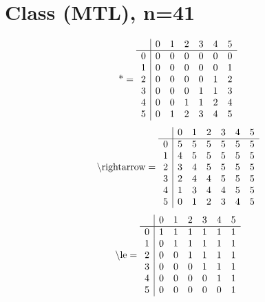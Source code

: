\documentclass[11pt]{article}
\begin{document}
\section{Class (MTL), n=41}
\[\text{*} = 
\begin{array}{r | r r r r r r}
 & 0 & 1 & 2 & 3 & 4 & 5 \\ \hline
0 & 0 & 0 & 0 & 0 & 0 & 0 \\
1 & 0 & 0 & 0 & 0 & 0 & 1 \\
2 & 0 & 0 & 0 & 0 & 1 & 2 \\
3 & 0 & 0 & 0 & 1 & 1 & 3 \\
4 & 0 & 0 & 1 & 1 & 2 & 4 \\
5 & 0 & 1 & 2 & 3 & 4 & 5 \\
\end{array}
\]
\[\text{\textbackslash rightarrow} = 
\begin{array}{r | r r r r r r}
 & 0 & 1 & 2 & 3 & 4 & 5 \\ \hline
0 & 5 & 5 & 5 & 5 & 5 & 5 \\
1 & 4 & 5 & 5 & 5 & 5 & 5 \\
2 & 3 & 4 & 5 & 5 & 5 & 5 \\
3 & 2 & 4 & 4 & 5 & 5 & 5 \\
4 & 1 & 3 & 4 & 4 & 5 & 5 \\
5 & 0 & 1 & 2 & 3 & 4 & 5 \\
\end{array}
\]
\[\text{\textbackslash le} = 
\begin{array}{r | r r r r r r}
 & 0 & 1 & 2 & 3 & 4 & 5 \\ \hline
0 & 1 & 1 & 1 & 1 & 1 & 1 \\
1 & 0 & 1 & 1 & 1 & 1 & 1 \\
2 & 0 & 0 & 1 & 1 & 1 & 1 \\
3 & 0 & 0 & 0 & 1 & 1 & 1 \\
4 & 0 & 0 & 0 & 0 & 1 & 1 \\
5 & 0 & 0 & 0 & 0 & 0 & 1 \\
\end{array}
\]
\end{document}
